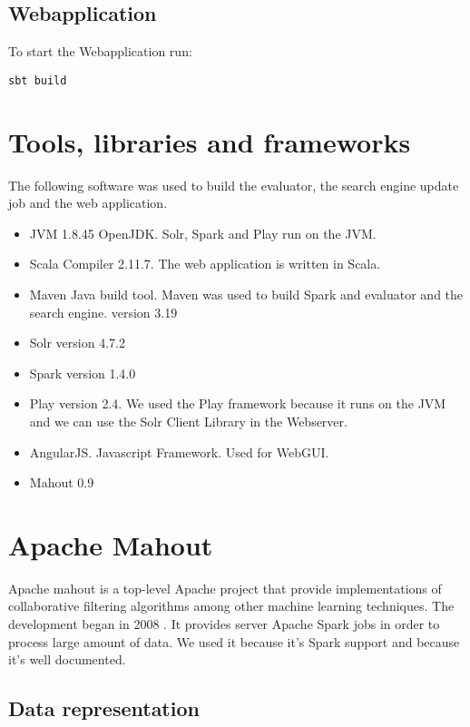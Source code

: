 \documentclass[twoside,a4paper]{article}
\begin{document}
\subsection{Webapplication}
\label{sec:web}

To start the Webapplication run:
\begin{verbatim}
sbt build 
\end{verbatim}

\appendix

\section{Tools, libraries and frameworks}

The following software was used to build the evaluator, the search engine update job and the web application.
\begin{itemize}
\item JVM 1.8.45 OpenJDK. Solr, Spark and Play run on the JVM.
\item Scala Compiler 2.11.7. The web application is written in Scala.
\item Maven Java build tool. Maven was used to build Spark and evaluator and the search engine. version 3.19
\item Solr version 4.7.2
\item Spark version 1.4.0
\item Play version 2.4. We used the Play framework because it runs on the JVM and we can use the Solr Client Library in the Webserver.
\item AngularJS. Javascript Framework. Used for WebGUI.
\item Mahout 0.9 
\end{itemize}

\section{Apache Mahout}
\label{sec:mahout}

Apache mahout is a top-level Apache project that provide implementations of collaborative filtering algorithms among other machine learning techniques. The development began in 2008 \cite{Owen}. It provides server Apache Spark jobs in order to process large amount of data. We used it because it's Spark support and because it's well documented.

\subsection{Data representation}
\label{sec:datarepresentation}
\end{document}
